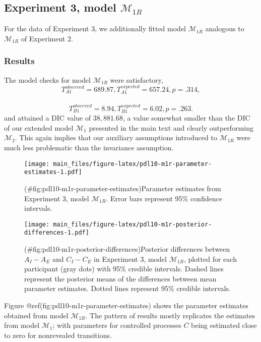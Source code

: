 \begin{appendix}
\subsection{\texorpdfstring{Experiment 3, model
\(\mathcal{M}_{1R}\)}{Experiment 3, model \textbackslash{}mathcal\{M\}\_\{1R\}}}\label{experiment-3-model-mathcalm_1r}

For the data of Experiment 3, we additionally fitted model
\(\mathcal{M}_{1R}\) analogous to \(\mathcal{M}_{1R}\) of Experiment 2.

\subsubsection{Results}\label{results-2}

The model checks for model \(\mathcal{M}_{1R}\) were satisfactory,
\[T_{A1}^{observed} = 689.87, T_{A1}^{expected} = 657.24, p = .314,\]~
\[T_{B1}^{observed} = 8.94, T_{B1}^{expected} = 6.02, p = .263.\] and
attained a DIC value of \(38{,}881.68\), a value somewhat smaller than
the DIC of our extended model \(\mathcal{M}_{1}\) presented in the main
text and clearly outperforming \(\mathcal{M}_2\). This again implies
that our auxiliary assumptions introduced to \(\mathcal{M}_{1R}\) were
much less problematic than the invariance assumption.

\begin{figure}
\centering
\texttt{[image: main\_files/figure-latex/pdl10-m1r-parameter-estimates-1.pdf]}
\caption{(\#fig:pdl10-m1r-parameter-estimates)Parameter estimates from
Experiment 3, model \(\mathcal{M}_{1R}\). Error bars represent 95\%
confidence intervals.}
\end{figure}

\begin{figure}
\centering
\texttt{[image: main\_files/figure-latex/pdl10-m1r-posterior-differences-1.pdf]}
\caption{(\#fig:pdl10-m1r-posterior-differences)Posterior differences
between \(A_I - A_E\) and \(C_I - C_E\) in Experiment 3, model
\(\mathcal{M}_{1R}\), plotted for each participant (gray dots) with 95\%
credible intervals. Dashed lines represent the posterior means of the
differences between mean parameter estimates. Dotted lines represent
95\% credible intervals.}
\end{figure}

Figure @ref(fig:pdl10-m1r-parameter-estimates) shows the parameter
estimates obtained from model \(\mathcal{M}_{1R}\). The pattern of
results mostly replicates the estimates from model \(\mathcal{M}_1\);
with parameters for controlled processes \(C\) being estimated close to
zero for nonrevealed transitions.


\end{appendix}
